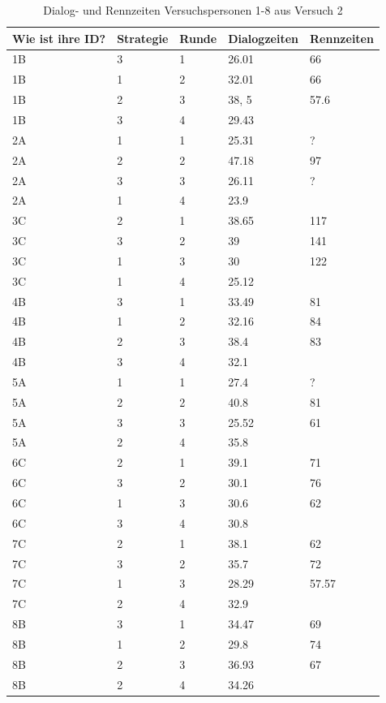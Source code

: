 \documentclass[12pt,a4paper]{scrartcl}
\begin{document}
\begin{appendix}
\begin{table}
\centering
\caption{Dialog- und Rennzeiten Versuchspersonen 1-8 aus Versuch 2}
\begin{tabular}{ | l | l | l | l | l | }
\hline
Wie ist ihre ID? & Strategie & Runde & Dialogzeiten & Rennzeiten \\ \hline \hline
	1B & 3 & 1 & 26.01 & 66 \\ \hline
	1B & 1 & 2 & 32.01 & 66 \\ \hline
	1B & 2 & 3 & 38, 5 & 57.6 \\ \hline
	1B & 3 & 4 & 29.43 &  \\ \hline \hline
	2A & 1 & 1 & 25.31 & ? \\ \hline
	2A & 2 & 2 & 47.18 & 97 \\ \hline
	2A & 3 & 3 & 26.11 & ? \\ \hline
	2A & 1 & 4 & 23.9 &  \\ \hline \hline
	3C & 2 & 1 & 38.65 & 117 \\ \hline
	3C & 3 & 2 & 39 & 141 \\ \hline
	3C & 1 & 3 & 30 & 122 \\ \hline
	3C & 1 & 4 & 25.12 &  \\ \hline \hline
	4B & 3 & 1 & 33.49 & 81 \\ \hline
	4B & 1 & 2 & 32.16 & 84 \\ \hline
	4B & 2 & 3 & 38.4 & 83 \\ \hline
	4B & 3 & 4 & 32.1 &  \\ \hline \hline
	5A & 1 & 1 & 27.4 & ? \\ \hline
	5A & 2 & 2 & 40.8 & 81 \\ \hline
	5A & 3 & 3 & 25.52 & 61 \\ \hline
	5A & 2 & 4 & 35.8 &  \\ \hline \hline
	6C & 2 & 1 & 39.1 & 71 \\ \hline
	6C & 3 & 2 & 30.1 & 76 \\ \hline
	6C & 1 & 3 & 30.6 & 62 \\ \hline
	6C & 3 & 4 & 30.8 &  \\ \hline \hline
	7C & 2 & 1 & 38.1 & 62 \\ \hline
	7C & 3 & 2 & 35.7 & 72 \\ \hline
	7C & 1 & 3 & 28.29 & 57.57 \\ \hline
	7C & 2 & 4 & 32.9 &  \\ \hline \hline
	8B & 3 & 1 & 34.47 & 69 \\ \hline
	8B & 1 & 2 & 29.8 & 74 \\ \hline
	8B & 2 & 3 & 36.93 & 67 \\ \hline
	8B & 2 & 4 & 34.26 &  \\ \hline


\end{tabular}
\end{table}
\end{appendix}
\end{document}
